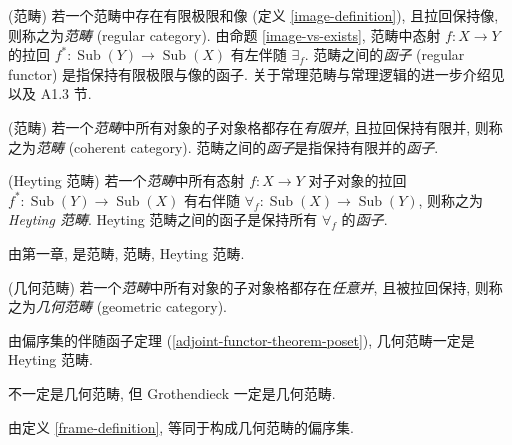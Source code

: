 \begin{definition}
	[label={regular-category}]
	{(\regular{}范畴)}
	若一个范畴中存在有限极限和像 (定义 \ref{image-definition}), 且拉回保持像, 则称之为\emph{\regular{}范畴} (regular category).
	由命题 \ref{image-vs-exists}, \regular{}范畴中态射 $f\colon X\to Y$ 的拉回 $f^*\colon \operatorname{Sub}(Y)\to \operatorname{Sub}(X)$ 有左伴随 $\exists_f$.
	\regular{}范畴之间的\emph{\regular{}函子} (regular functor) 是指保持有限极限与像的函子. 关于常理范畴与常理逻辑的进一步介绍见 \cite{Butz1998RegularCA} 以及 \cite{Elephant} A1.3 节.
\end{definition}

\begin{definition}
	[label={coherent-category}]
	{(\coherent{}范畴)}
	若一个\emph{\regular{}范畴}中所有对象的子对象格都存在\emph{有限并}, 且拉回保持有限并, 则称之为\emph{\coherent{}范畴} (coherent category).
	\coherent{}范畴之间的\emph{\coherent{}函子}是指保持有限并的\emph{\regular{}函子}.
\end{definition}

\begin{definition}
	[label={Heyting-category}]
	{(Heyting 范畴)}
	若一个\emph{\coherent{}范畴}中所有态射 $f\colon X\to Y$ 对子对象的拉回 $f^*\colon \operatorname{Sub}(Y)\to\operatorname{Sub}(X)$ 有右伴随 $\forall_f\colon \operatorname{Sub}(X)\to \operatorname{Sub}(Y)$, 则称之为 \emph{Heyting 范畴}.
	Heyting 范畴之间的函子是保持所有 $\forall_f$ 的\emph{\coherent{}函子}.
\end{definition}

由第一章, \topos{}是\regular{}范畴, \coherent{}范畴, Heyting 范畴.

\begin{definition}
	[label={geometric-category}]
	{(几何范畴)}
	若一个\emph{\regular{}范畴}中所有对象的子对象格都存在\emph{任意并}, 且被拉回保持, 则称之为\emph{几何范畴} (geometric category).
\end{definition}

由偏序集的伴随函子定理 (\ref{adjoint-functor-theorem-poset}), 几何范畴一定是 Heyting 范畴.

\topos{}不一定是几何范畴, 但 Grothendieck \topos{}一定是几何范畴.

由定义 \ref{frame-definition}, \fm{}等同于构成几何范畴的偏序集.


